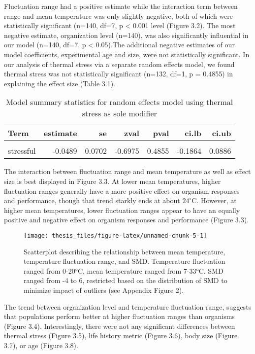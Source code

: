 \documentclass[12pt,twoside]{reedthesis}
\begin{document}
Fluctuation range had a positive estimate while the interaction term between range and mean temperature was only slightly negative, both of which were statistically significant (n=140, df=7, p \textless{} 0.001 level (Figure 3.2). The most negative estimate, organization level (n=140), was also significantly influential in our model (n=140, df=7, p \textless{} 0.05).The additional negative estimates of our model coefficients, experimental age and size, were not statistically significant. In our analysis of thermal stress via a separate random effects model, we found thermal stress was not statistically significant (n=132, df=1, p = 0.4855) in explaining the effect size (Table 3.1).
\begin{table}[!h]

\caption[Thermal stress model summary statistics]{\label{tab:unnamed-chunk-4}Model summary statistics for random effects model using thermal stress as sole modifier}
\centering
\begin{tabular}[t]{lrrrrrr}
\toprule
\textbf{Term} & \textbf{estimate} & \textbf{se} & \textbf{zval} & \textbf{pval} & \textbf{ci.lb} & \textbf{ci.ub}\\
\midrule
\cellcolor{gray!6}{intercept} & \cellcolor{gray!6}{0.2050} & \cellcolor{gray!6}{0.1846} & \cellcolor{gray!6}{1.1104} & \cellcolor{gray!6}{0.2668} & \cellcolor{gray!6}{-0.1568} & \cellcolor{gray!6}{0.5669}\\
stressful & -0.0489 & 0.0702 & -0.6975 & 0.4855 & -0.1864 & 0.0886\\
\bottomrule
\end{tabular}
\end{table}
\clearpage

The interaction between fluctuation range and mean temperature as well as effect size is best displayed in Figure 3.3. At lower mean temperatures, higher fluctuation ranges generally have a more positive effect on organism responses and performance, though that trend starkly ends at about \(24^{\circ}\)C. However, at higher mean temperatures, lower fluctuation ranges appear to have an equally positive and negative effect on organism responses and performance (Figure 3.3).
\begin{figure}

{\centering \texttt{[image: thesis\_files/figure-latex/unnamed-chunk-5-1]} 

}

\caption[Scatterplot of relationship between range, mean, and SMD]{Scatterplot describing the relationship between mean temperature, temperature fluctuation range, and SMD. Temperature fluctuation ranged from 0-20°C, mean temperature ranged from 7-33°C. SMD ranged from -4 to 6, restricted based on the distribution of SMD to minimize impact of outliers (see Appendix Figure 2).}\label{fig:unnamed-chunk-5}
\end{figure}
The trend between organization level and temperature fluctuation range, suggests that populations perform better at higher fluctuation ranges than organisms (Figure 3.4). Interestingly, there were not any significant differences between thermal stress (Figure 3.5), life history metric (Figure 3.6), body size (Figure 3.7), or age (Figure 3.8).
\end{document}
